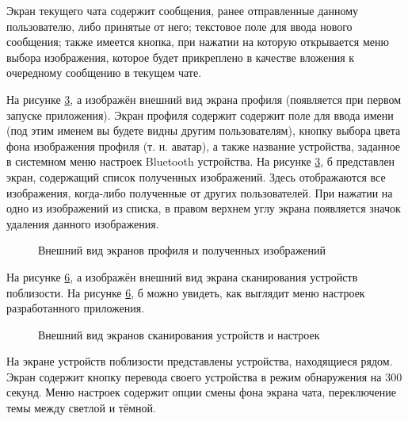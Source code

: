 Экран текущего чата содержит сообщения, ранее отправленные данному пользователю, либо принятые от него; текстовое поле для ввода нового сообщения; также имеется кнопка, при нажатии на которую открывается меню выбора изображения, которое будет прикреплено в качестве вложения к очередному сообщению в текущем чате.

На рисунке \ref{fig:profile_and_receivied_images_activities}, а изображён внешний вид экрана профиля (появляется при первом запуске приложения). Экран профиля содержит содержит поле для ввода имени (под этим именем вы будете видны другим пользователям), кнопку выбора цвета фона изображения профиля (т. н. аватар), а также название устройства, заданное в системном меню настроек Bluetooth устройства.
На рисунке \ref{fig:profile_and_receivied_images_activities}, б представлен экран, содержащий список полученных изображений. Здесь отображаются все изображения, когда-либо полученные от других пользователей.
При нажатии на одно из изображений из списка, в правом верхнем углу экрана появляется значок удаления данного изображения.

\begin{figure}[ht]
	\centering
	\begin{subfigure}[t]{0.48\textwidth}
	    \centering                                                           
		\label{fig:profile_activity}
		\caption{}
	\end{subfigure}
	\begin{subfigure}[t]{0.48\textwidth}
	    \centering                                                           
		\label{fig:received_images_activity}
		\caption{}
	\end{subfigure}
	\caption{Внешний вид экранов профиля и полученных изображений}
	\label{fig:profile_and_receivied_images_activities}
\end{figure}

На рисунке \ref{fig:scan_and_settings_activities}, а изображён внешний вид экрана сканирования устройств поблизости. На рисунке \ref{fig:scan_and_settings_activities}, б можно увидеть, как выглядит меню настроек разработанного приложения.

\begin{figure}[ht]
	\centering
	\begin{subfigure}[t]{0.48\textwidth}
	    \centering                                                           
		\label{fig:scan_activity}
		\caption{}
	\end{subfigure}
	\begin{subfigure}[t]{0.48\textwidth}
	    \centering                                                           
		\label{fig:settings_activity}
		\caption{}
	\end{subfigure}
	\caption{Внешний вид экранов сканирования устройств и настроек}
	\label{fig:scan_and_settings_activities}
\end{figure}

На экране устройств поблизости представлены устройства, находящиеся рядом. Экран содержит кнопку перевода своего устройства в режим обнаружения на 300 секунд. Меню настроек содержит опции смены фона экрана чата, переключение темы между светлой и тёмной.
